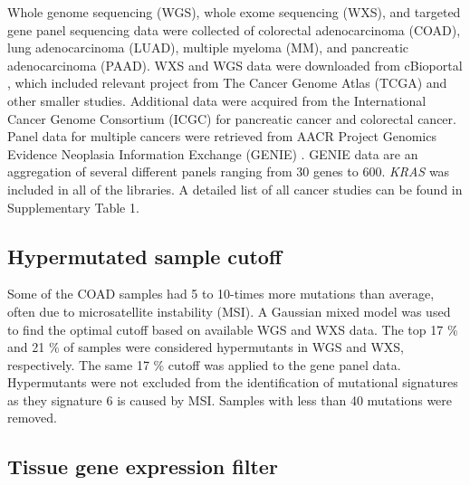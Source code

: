 \documentclass[english, 12pt, letterpaper]{article}
\newcommand{\KRAS}{\emph{KRAS}}
\begin{document}
Whole genome sequencing (WGS), whole exome sequencing (WXS), and targeted gene panel sequencing data were collected of colorectal adenocarcinoma (COAD), lung adenocarcinoma (LUAD), multiple myeloma (MM), and pancreatic adenocarcinoma (PAAD).
WXS and WGS data were downloaded from cBioportal \cite{Gao2013, Cerami2012}, which included relevant project from The Cancer Genome Atlas (TCGA) \cite{CancerGenomeAtlasNetwork2012, CancerGenomeAtlasResearchNetwork2014, CancerGenomeAtlasResearchNetwork.Electronicaddress:andrew_aguirredfci.harvard.edu2017} and other smaller studies. 
Additional data were acquired from the International Cancer Genome Consortium (ICGC) for pancreatic cancer \cite{Scarlett2011} and colorectal cancer. 
Panel data for multiple cancers were retrieved from AACR Project Genomics Evidence Neoplasia Information Exchange (GENIE) \cite{AACRProjectGENIEConsortium2017AACRConsortium.}.
GENIE data are an aggregation of several different panels ranging from 30 genes to 600.
\KRAS{} was included in all of the libraries. 
A detailed list of all cancer studies can be found in Supplementary Table 1.


\subsection*{Hypermutated sample cutoff}

Some of the COAD samples had 5 to 10-times more mutations than average, often due to microsatellite instability (MSI). 
A Gaussian mixed model was used to find the optimal cutoff based on available WGS and WXS data. 
The top 17 \% and 21 \% of samples were considered hypermutants in WGS and WXS, respectively.
The same 17 \% cutoff was applied to the gene panel data. 
Hypermutants were not excluded from the identification of mutational signatures as they signature 6 is caused by MSI.
Samples with less than 40 mutations were removed.


\subsection*{Tissue gene expression filter}
\end{document}
